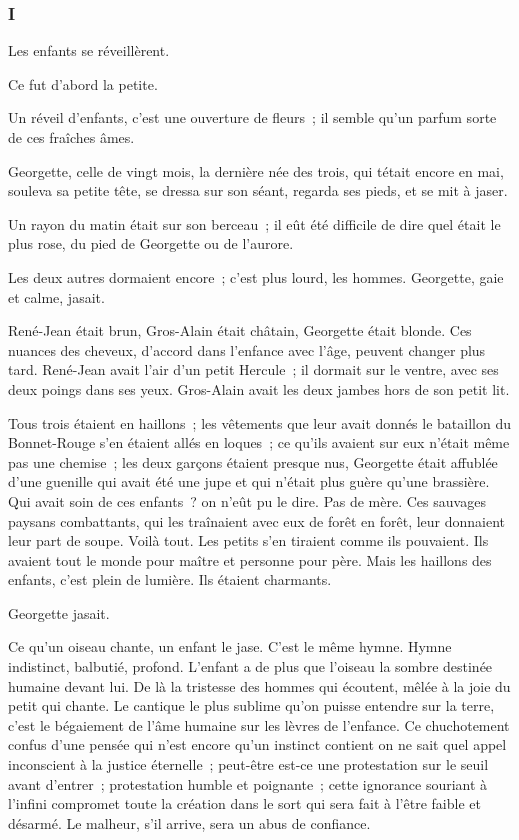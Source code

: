 \documentclass[french,twoside]{book} %
\begin{document}
\subsubsection[{I}]{I}
\label{p3l3c1}
\noindent Les enfants se réveillèrent.\par
Ce fut d’abord la petite.\par
Un réveil d’enfants, c’est une ouverture de fleurs ; il semble qu’un parfum sorte de ces fraîches âmes.\par
Georgette, celle de vingt mois, la dernière née des trois, qui tétait encore en mai, souleva sa petite tête, se dressa sur son séant, regarda ses pieds, et se mit à jaser.\par
Un rayon du matin était sur son berceau ; il eût été difficile de dire quel était le plus rose, du pied de Georgette ou de l’aurore.\par
Les deux autres dormaient encore ; c’est plus lourd, les hommes. Georgette, gaie et calme, jasait.\par
 René-Jean était brun, Gros-Alain était châtain, Georgette était blonde. Ces nuances des cheveux, d’accord dans l’enfance avec l’âge, peuvent changer plus tard. René-Jean avait l’air d’un petit Hercule ; il dormait sur le ventre, avec ses deux poings dans ses yeux. Gros-Alain avait les deux jambes hors de son petit lit.\par
Tous trois étaient en haillons ; les vêtements que leur avait donnés le bataillon du Bonnet-Rouge s’en étaient allés en loques ; ce qu’ils avaient sur eux n’était même pas une chemise ; les deux garçons étaient presque nus, Georgette était affublée d’une guenille qui avait été une jupe et qui n’était plus guère qu’une brassière. Qui avait soin de ces enfants ? on n’eût pu le dire. Pas de mère. Ces sauvages paysans combattants, qui les traînaient avec eux de forêt en forêt, leur donnaient leur part de soupe. Voilà tout. Les petits s’en tiraient comme ils pouvaient. Ils avaient tout le monde pour maître et personne pour père. Mais les haillons des enfants, c’est plein de lumière. Ils étaient charmants.\par
Georgette jasait.\par
Ce qu’un oiseau chante, un enfant le jase. C’est le même hymne. Hymne indistinct, balbutié, profond. L’enfant a de plus que l’oiseau la sombre destinée humaine devant lui. De là la tristesse des hommes qui écoutent, mêlée à la joie du petit qui chante. Le cantique le plus sublime qu’on puisse entendre sur la terre, c’est le bégaiement de l’âme humaine sur les lèvres de l’enfance. Ce chuchotement confus d’une  pensée qui n’est encore qu’un instinct contient on ne sait quel appel inconscient à la justice éternelle ; peut-être est-ce une protestation sur le seuil avant d’entrer ; protestation humble et poignante ; cette ignorance souriant à l’infini compromet toute la création dans le sort qui sera fait à l’être faible et désarmé. Le malheur, s’il arrive, sera un abus de confiance.\par
\end{document}
